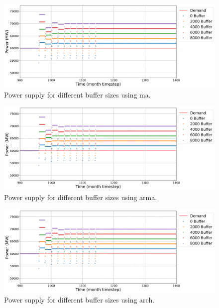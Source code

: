 \documentclass[11pt]{article}
\begin{document}
\begin{figure}[H]
	\centering
	\includegraphics[width=\textwidth]{23-figures/23-power-buffer-ma.png} 
	\hfill
	\caption{Power supply for different buffer sizes using ma.}
	\label{fig:23-buf-ma}
\end{figure}

\begin{figure}[H]
	\centering
	\includegraphics[width=\textwidth]{23-figures/23-power-buffer-arma.png} 
	\hfill
    \caption{Power supply for different buffer sizes using arma.}
	\label{fig:23-buf-arma}
\end{figure}

\begin{figure}[H]
	\centering
	\includegraphics[width=\textwidth]{23-figures/23-power-buffer-arch.png} 
	\hfill
    \caption{Power supply for different buffer sizes using arch.}
	\label{fig:23-buf-arch}
\end{figure}
\end{document}
